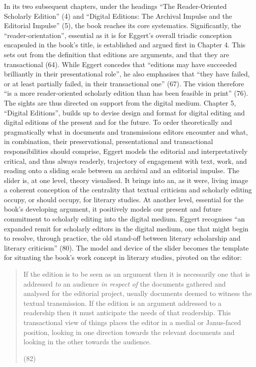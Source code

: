 \begin{review}
In its two subsequent chapters, under the headings ``The Reader-Oriented
Scholarly Edition'' (4) and ``Digital Editions: The Archival Impulse and
the Editorial Impulse'' (5), the book reaches its core systematics.
Significantly, the ``reader-orientation'', essential as it is for
Eggert's overall triadic conception encapsuled in the book's title, is
established and argued first in Chapter 4. This sets out from the
definition that editions are arguments, and that they are transactional
(64). While Eggert concedes that ``editions may have succeeded
brilliantly in their presentational role'', he also emphasises that
``they have failed, or at least partially failed, in their transactional
one'' (67). The vision therefore ``is a more reader-oriented scholarly
edition than has been feasible in print'' (76). The sights are thus
directed on support from the digital medium. Chapter 5, ``Digital
Editions'', builds up to devise design and format for digital editing
and digital editions of the present and for the future. To order
theoretically and pragmatically what in documents and transmissions
editors encounter and what, in combination, their preservational,
presentational and transactional responsibilities should comprise,
Eggert models the editorial and interpretatively critical, and thus
always readerly, trajectory of engagement with text, work, and reading
onto a sliding scale between an archival and an editorial impulse. The
slider is, at one level, theory visualised. It brings into an, as it
were, living image a coherent conception of the centrality that textual
criticism and scholarly editing occupy, or should occupy, for literary
studies. At another level, essential for the book's developing argument,
it positively models our present and future commitment to scholarly
editing into the digital medium. Eggert recognises ``an expanded remit
for scholarly editors in the digital medium, one that might begin to
resolve, through practice, the old stand-off between literary
scholarship and literary criticism'' (80). The model and device of the
slider becomes the template for situating the book's work concept in
literary studies, pivoted on the editor:

\begin{quote}
If the edition is to be seen as an argument then it is necessarily one
that is addressed \emph{to} an audience \emph{in respect of} the
documents gathered and analysed for the editorial project, usually
documents deemed to witness the textual transmission. If the edition is
an argument addressed to a readership then it must anticipate the needs
of that readership. This transactional view of things places the editor
in a medial or Janus-faced position, looking in one direction towards
the relevant documents and looking in the other towards the audience.
\begin{flushright}
(82)
\end{flushright}
\end{quote}


\end{review}
